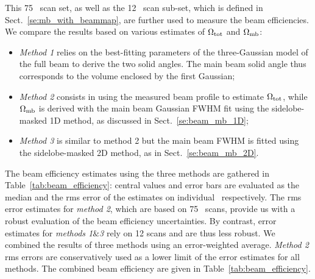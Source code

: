 This 75 \bm\ scan set, as well as the 12 \bm\ scan sub-set, which is
defined in Sect.~\ref{se:mb_with_beammap}, are further used to measure the beam
efficiencies. We compare the results based on various estimates of
$\Omega_{\rm{tot}}$ and $\Omega_{\rm{mb}}$:
\begin{itemize}
  \item{\emph{Method 1} relies on the best-fitting parameters of the
    three-Gaussian model of the full beam to derive the two solid
    angles. The main beam solid angle thus corresponds to the volume
    enclosed by the first Gaussian;}
  \item{\emph{Method 2} consists in using the measured beam profile to
    estimate $\Omega_{\rm{tot}}$, while $\Omega_{\rm{mb}}$ is derived
    with the main beam Gaussian FWHM fit using the sidelobe-masked 1D
    method, as discussed in Sect.~\ref{se:beam_mb_1D};}
  \item{\emph{Method 3} is similar to method 2 but the main beam FWHM is
    fitted using the sidelobe-masked 2D method, as in Sect.~\ref{se:beam_mb_2D}.}  
\end{itemize}

The beam efficiency estimates using the three methods are gathered
in Table~\ref{tab:beam_efficiency}: central values and error
bars are evaluated as the median and the rms error of the
estimates on individual \bms\ respectively. The rms error estimates
for \emph{method 2}, which are based on 75 \bm\ scans, provide us with
a robust evaluation of the beam efficiency uncertainties. By contrast, error
estimates for \emph{methods 1$\&$3} rely on 12 scans and are thus less
robust. We combined the results of three methods using an error-weighted
average. \emph{Method 2} rms errors are conservatively used as a lower
limit of the error estimates for all methods. The combined beam
efficiency are given in Table~\ref{tab:beam_efficiency}.  

